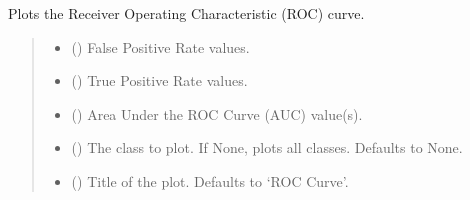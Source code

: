 \documentclass[letterpaper,10pt,english]{sphinxmanual}
\begin{document}
\begin{fulllineitems}
\label{\detokenize{calzone:calzone.vis.plot_roc_curve}}
\pysigstartsignatures
{}
\pysigstopsignatures
\sphinxAtStartPar
Plots the Receiver Operating Characteristic (ROC) curve.
\begin{quote}\begin{description}
\begin{itemize}
\item {} 
\sphinxAtStartPar
{} () \textendash{} False Positive Rate values.

\item {} 
\sphinxAtStartPar
{} () \textendash{} True Positive Rate values.

\item {} 
\sphinxAtStartPar
{} () \textendash{} Area Under the ROC Curve (AUC) value(s).

\item {} 
\sphinxAtStartPar
{} (\sphinxstyleliteralemphasis{\sphinxupquote{, }}) \textendash{} The class to plot. If None, plots all classes. Defaults to None.

\item {} 
\sphinxAtStartPar
{} (\sphinxstyleliteralemphasis{\sphinxupquote{, }}) \textendash{} Title of the plot. Defaults to ‘ROC Curve’.


\end{itemize}
\end{description}
\end{quote}
\end{fulllineitems}
\end{document}
